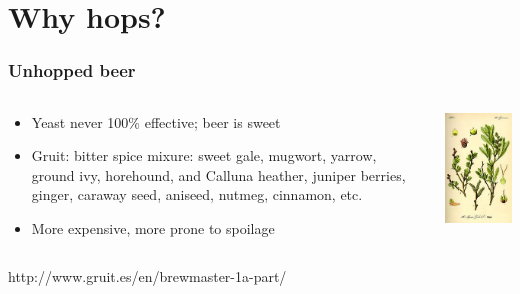 \documentclass{beamer}
\begin{document}
\section{Why hops?}

\begin{frame}\frametitle{Unhopped beer}
  \begin{columns}
    \begin{column}{0.6\textwidth}
    \begin{itemize}
    \item Yeast never 100\% effective; beer is sweet
    \item Gruit: bitter spice mixure: sweet gale, mugwort, yarrow, ground ivy, horehound, and Calluna heather, juniper berries, ginger, caraway seed, aniseed, nutmeg, cinnamon, etc.
    \item More expensive, more prone to spoilage
    \end{itemize}
  \end{column}
  \begin{column}{0.5\textwidth}
    \begin{center}
      \centering  \includegraphics[width=.7\linewidth]{./brewing/hops/Gruit-Mixture.jpg}
    \end{center}
  \end{column}
  \end{columns}
      \tiny{http://www.gruit.es/en/brewmaster-1a-part/}
\end{frame}
\end{document}
